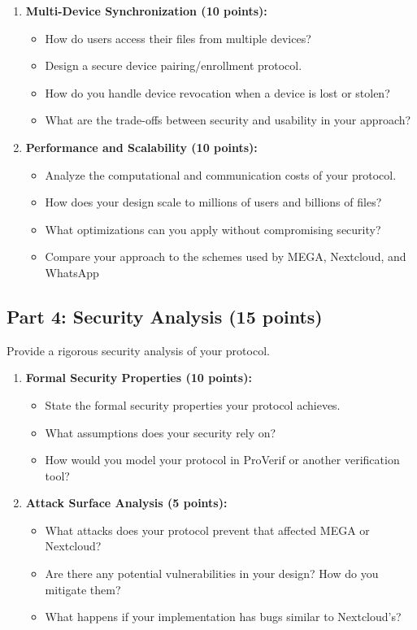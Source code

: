 \documentclass[10pt,a4paper,american]{exam}
\begin{document}
\begin{enumerate}
	\item \textbf{Multi-Device Synchronization (10 points):}
	      \begin{itemize}
		      \item How do users access their files from multiple devices?
		      \item Design a secure device pairing/enrollment protocol.
		      \item How do you handle device revocation when a device is lost or stolen?
		      \item What are the trade-offs between security and usability in your approach?
	      \end{itemize}

	\item \textbf{Performance and Scalability (10 points):}
	      \begin{itemize}
		      \item Analyze the computational and communication costs of your protocol.
		      \item How does your design scale to millions of users and billions of files?
		      \item What optimizations can you apply without compromising security?
		      \item Compare your approach to the schemes used by MEGA, Nextcloud, and WhatsApp
	      \end{itemize}
\end{enumerate}

\subsection{Part 4: Security Analysis (15 points)}

Provide a rigorous security analysis of your protocol.

\begin{enumerate}
	\item \textbf{Formal Security Properties (10 points):}
	      \begin{itemize}
		      \item State the formal security properties your protocol achieves.
		      \item What assumptions does your security rely on?
		      \item How would you model your protocol in ProVerif or another verification tool?
	      \end{itemize}

	\item \textbf{Attack Surface Analysis (5 points):}
	      \begin{itemize}
		      \item What attacks does your protocol prevent that affected MEGA or Nextcloud?
		      \item Are there any potential vulnerabilities in your design? How do you mitigate them?
		      \item What happens if your implementation has bugs similar to Nextcloud's?
	      \end{itemize}
\end{enumerate}
\end{document}
